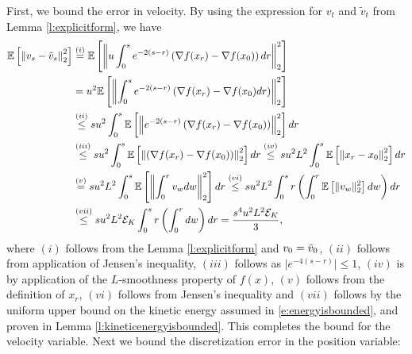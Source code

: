 \begin{Proof}
First, we bound the error in velocity. By using the expression for $v_t$ and $\tilde{v}_t$ from Lemma \ref{l:explicitform}, we have 
\begin{align*}
\mathbb{E}\left[\left\| v_s -\tilde{v}_s \right\|_2^2 \right] & \overset{(i)}{=} \mathbb{E} \left[ \left\lVert u \int_0^s e^{-2(s-r)}\left( \nabla f(x_r) - \nabla f(x_0) \right)dr\right\rVert_2^2\right]\\
& = u^2 \mathbb{E} \left[ \left\lVert  \int_0^s e^{-2(s-r)}\left( \nabla f(x_r) - \nabla f(x_0) dr\right)\right\rVert_2^2\right]\\
& \overset{(ii)}{\le} s u^2 \int_0^s \mathbb{E} \left[ \left\lVert e^{-2(s-r)}\left( \nabla f(x_r) - \nabla f(x_0) \right)\right\rVert_2^2\right]dr\\
& \overset{(iii)}{\le} s u^2 \int_0^s \mathbb{E} \left[ \left\lVert \left( \nabla f(x_r) - \nabla f(x_0) \right)\right\rVert_2^2\right]dr \overset{(iv)}{\le} s u^2 L^2 \int_0^s \mathbb{E} \left[\left \lVert x_r - x_0 \right \rVert_2^2\right]dr\\
& \overset{(v)}{=} s u^2 L^2 \int_0^s  \mathbb{E} \left[\left \lVert \int_0^r v_w dw \right \rVert_2^2\right]dr \overset{(vi)}{\le} s u^2 L^2\int_0^s r \left(\int_0^r \mathbb{E}\left[ \lVert v_w \rVert_2^2\right] dw\right)dr\\
& \overset{(vii)}{\le} s u^2 L^2 \mathcal{E}_K \int_0^s r \left(\int_0^r dw\right) dr = \frac{s^4 u^2 L^2 \mathcal{E}_K}{3},
\end{align*}
where $(i)$ follows from the Lemma \ref{l:explicitform} and $v_0=\tilde{v}_0$, $(ii)$ follows from application of Jensen's inequality, $(iii)$ follows as $\lvert e^{-4(s-r)}\rvert \le 1$, $(iv)$ is by application of the $L$-smoothness property of $f(x)$, $(v)$ follows from the definition of $x_r$, $(vi)$ follows from Jensen's inequality and $(vii)$ follows by the uniform upper bound on the kinetic energy assumed in \eqref{e:energyisbounded}, and proven in Lemma \ref{l:kineticenergyisbounded}. This completes the bound for the velocity variable. Next we bound the discretization error in the position variable:

\end{Proof}
